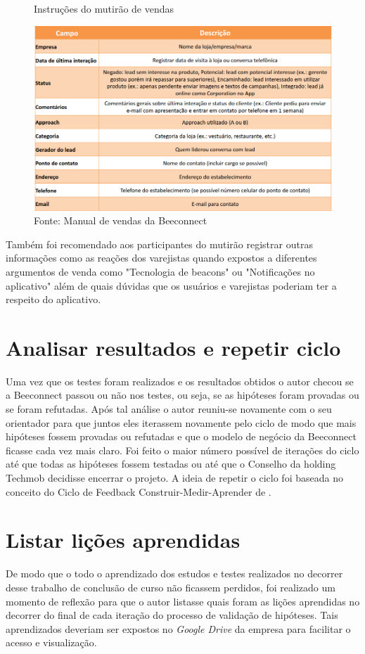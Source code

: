 \begin{figure}[H]
\caption{Instruções do mutirão de vendas}
\centerline{\includegraphics[width=1.0\textwidth]{img/intrucoes_mutirao}}
\label{fig:intrucoes_mutirao}
\caption* {Fonte: Manual de vendas da Beeconnect}
\end{figure}

Também foi recomendado aos participantes do mutirão registrar outras informações como as reações dos varejistas quando expostos a diferentes argumentos de venda como "Tecnologia de beacons" ou "Notificações no aplicativo" além de quais dúvidas que os usuários e varejistas poderiam ter a respeito do aplicativo.

\section{Analisar resultados e repetir ciclo}
\label{cha:analisar_resultados}
Uma vez que os testes foram realizados e os resultados obtidos o autor checou se a Beeconnect passou ou não nos testes, ou seja, se as hipóteses foram provadas ou se foram refutadas. 
Após tal análise o autor reuniu-se novamente com o seu orientador para que juntos eles iterassem novamente pelo ciclo de modo que mais hipóteses fossem provadas ou refutadas e que o modelo de negócio da Beeconnect ficasse cada vez mais claro. Foi feito o maior número possível de iterações do ciclo até que todas as hipóteses fossem testadas ou até que o Conselho da holding Techmob decidisse encerrar o projeto. A ideia de repetir o ciclo foi baseada no conceito do Ciclo de Feedback Construir-Medir-Aprender de .

\section{Listar lições aprendidas}
\label{cha:listar_licoes_aprendidas}
De modo que o todo o aprendizado dos estudos e testes realizados no decorrer desse trabalho de conclusão de curso não ficassem perdidos, foi realizado um momento de reflexão para que o autor listasse quais foram as lições aprendidas no decorrer do final de cada iteração do processo de validação de hipóteses. Tais aprendizados deveriam ser expostos no \textit{Google Drive} da empresa para facilitar o acesso e visualização.

